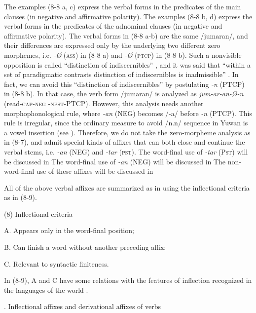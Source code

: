 The examples (8-8 a, c) express the verbal forms in the predicates of the main clauses (in negative and affirmative polarity). The examples (8-8 b, d) express the verbal forms in the predicates of the adnominal clauses (in negative and affirmative polarity). The verbal forms in (8-8 a-b) are the same /jumaran/, and their differences are expressed only by the underlying two different zero morphemes, i.e. \textit{{}-Ø} (\textsc{ass}) in (8-8 a) and \textit{{}-Ø} (\textsc{ptcp}) in (8-8 b). Such a nonvisible opposition is called “distinction of indiscernibles” \citep[36]{Haas1974}, and it was said that “within a set of paradigmatic contrasts distinction of indiscernibles is inadmissible” \citep[83]{McGregor2003}. In fact, we can avoid this “distinction of indiscernibles” by postulating \textit{{}-n} (PTCP) in (8-8 b). In that case, the verb form /jumaran/ is analyzed as \textit{jum-ar-an-Ø-n} (read-\textsc{cap}-\textsc{neg} -\textsc{npst}-PTCP). However, this analysis needs another morphophonological rule, where \textit{{}-an} (NEG) becomes /-a/ before \textit{{}-n} (PTCP). This rule is irregular, since the ordinary measure to avoid /n.n/ sequence in Yuwan is a vowel insertion (see ). Therefore, we do not take the zero-morpheme analysis as in (8-7), and admit special kinds of affixes that can both close and continue the verbal stems, i.e. \textit{{}-an} (NEG) and \textit{{}-tar} (\textsc{pst}). The word-final use of \textit{{}-tar} (P\textsc{st}) will be discussed in  The word-final use of \textit{{}-an} (NEG) will be discussed in  The non-word-final use of these affixes will be discussed in 

  All of the above verbal affixes are summarized as in  using the inflectional criteria as in (8-9).

(8)  Inflectional criteria

  A.  Appears only in the word-final position;

  B.  Can finish a word without another preceding affix;

  C.  Relevant to syntactic finiteness.

In (8-9), A and C have some relations with the features of inflection recognized in the languages of the world \citep[90]{Haspelmath2010}.

\begin{styleBeschriftung}
\textmd{}\textmd{. Inflectional affixes and derivational affixes of verbs}
\end{styleBeschriftung}

